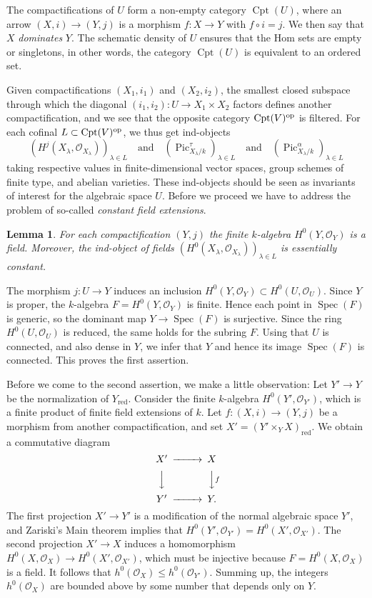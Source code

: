 \documentclass[oneside, 12pt]{amsart}
\newcommand\mylabel[1]{\label{#1}\marginpar{\vspace{-1ex}\medskip\medskip\footnotesize \tt #1}}
\renewcommand\mylabel[1]{\label{#1}}
\newtheorem{lemma}[theorem]{Lemma}
\theoremstyle{definition}
\theoremstyle{remark}
\renewcommand{\O}{\mathscr{O}}
\newcommand{\op}{\text{\rm op}}
\newcommand{\Pic}{\operatorname{Pic}}
\newcommand{\quadand}{\quad\text{and}\quad}
\newcommand{\ra}{\rightarrow}
\newcommand{\red}{{\operatorname{red}}}
\newcommand{\Spec}{\operatorname{Spec}}
\newcommand{\Cpt}{\operatorname{Cpt}}
\begin{document}
The compactifications of $U$ form a non-empty category $\Cpt(U)$, where an arrow $(X,i)\ra (Y,j)$
is a morphism $f:X\ra  Y$ with $f\circ i= j$. We then say that $X$ \emph{dominates} $Y$.
The schematic density of $U$  ensures
that the Hom sets are empty or singletons, in other words,  the category $\Cpt(U)$ is equivalent to an ordered set.

Given   compactifications $(X_1,i_1)$ and $(X_2,i_2)$, the smallest closed subspace
through which the diagonal   $(i_1,i_2):U\ra X_1\times X_2$ factors defines another
compactification, and we see that the opposite category $\Cpt(V)^\op$ is filtered.
For each cofinal $L\subset\Cpt(V)^\op$, we thus get    ind-objects 
$$
(H^j(X_\lambda,\O_{X_\lambda}))_{\lambda\in L}\quadand 
(\Pic^\tau_{X_\lambda/k})_{\lambda\in L}\quadand
(\Pic^\alpha_{X_\lambda/k})_{\lambda\in L}
$$
taking respective values in finite-dimensional vector spaces, group schemes of finite type,
and abelian varieties. These ind-objects should be seen as invariants of interest for the algebraic space  $U$.
Before we proceed we have to address the problem of  so-called \emph{constant field extensions}.

\begin{lemma}
\mylabel{ground field essentially constant}
For each compactification $(Y,j)$ the finite $k$-algebra $H^0(Y,\O_Y)$ is a field. Moreover,
the ind-object of fields $(H^0(X_\lambda,\O_{X_\lambda}))_{\lambda\in L}$  is essentially constant.
\end{lemma}

\proof
The morphism $j:U\ra Y$ induces an inclusion $H^0(Y,\O_Y)\subset H^0(U,\O_U)$. 
Since $Y$ is proper, the $k$-algebra $F=H^0(Y,\O_Y)$ is finite. 
Hence each point in $\Spec(F)$ is generic, so the dominant map $Y\ra \Spec(F)$ is surjective.
Since the ring $H^0(U,\O_U)$ is reduced, the same holds for the subring $F$.
Using that $U$ is connected, and also dense in $Y$, we infer that $Y$ and hence its image $\Spec(F)$ is connected.
This proves the first assertion. 

Before we come to the second assertion, we make a little observation:
Let $Y'\ra Y$ be the normalization of  $Y_\red$. Consider the finite $k$-algebra  $H^0(Y',\O_{Y'})$, which
is a finite product of   finite  field  extensions of $k$.
Let $f:(X,i)\ra (Y,j)$ be a morphism from another compactification, and set $X'=(Y'\times_YX)_\red$.
We obtain a commutative diagram
$$
\begin{CD}
X'	@>>>	 X\\
@VVV		@VVfV\\
Y'	@>>>	Y.
\end{CD}
$$
The first projection   $X'\ra Y'$ is a modification of the normal algebraic space $Y'$,
and Zariski's Main theorem implies that $H^0(Y',\O_{Y'})=H^0(X',\O_{X'})$.
The second projection $X'\ra X$ induces a homomorphism $H^0(X,\O_X)\ra H^0(X',\O_{X'})$, which must
be injective because $F=H^0(X,\O_X)$ is a field. It follows that $h^0(\O_X)\leq h^0(\O_{Y'})$.
Summing up, the integers $h^0(\O_X)$ are bounded above by some number that depends only on $Y$.
\end{document}
